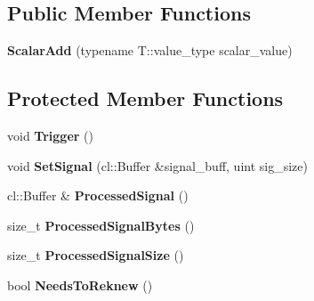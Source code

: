 \subsection*{Public Member Functions}
\begin{DoxyCompactItemize}
\item 
{\bfseries Scalar\+Add} (typename T\+::value\+\_\+type scalar\+\_\+value)\hypertarget{classjaspl_1_1ocl_1_1_scalar_add_a74c7684b1023fb5505afa57b65bbee2f}{}\label{classjaspl_1_1ocl_1_1_scalar_add_a74c7684b1023fb5505afa57b65bbee2f}

\end{DoxyCompactItemize}
\subsection*{Protected Member Functions}
\begin{DoxyCompactItemize}
\item 
void {\bfseries Trigger} ()\hypertarget{classjaspl_1_1ocl_1_1_scalar_add_a06f80054324b32d2a396f44e4220b061}{}\label{classjaspl_1_1ocl_1_1_scalar_add_a06f80054324b32d2a396f44e4220b061}

\item 
void {\bfseries Set\+Signal} (cl\+::\+Buffer \&signal\+\_\+buff, uint sig\+\_\+size)\hypertarget{classjaspl_1_1ocl_1_1_scalar_add_a5bb316f923cc37d6dff1144c1832decd}{}\label{classjaspl_1_1ocl_1_1_scalar_add_a5bb316f923cc37d6dff1144c1832decd}

\item 
cl\+::\+Buffer \& {\bfseries Processed\+Signal} ()\hypertarget{classjaspl_1_1ocl_1_1_scalar_add_a11727ab5b2e2c8bf8bdb8c9b8301caa0}{}\label{classjaspl_1_1ocl_1_1_scalar_add_a11727ab5b2e2c8bf8bdb8c9b8301caa0}

\item 
size\+\_\+t {\bfseries Processed\+Signal\+Bytes} ()\hypertarget{classjaspl_1_1ocl_1_1_scalar_add_aab31c814169b8419da653a79a150e3d2}{}\label{classjaspl_1_1ocl_1_1_scalar_add_aab31c814169b8419da653a79a150e3d2}

\item 
size\+\_\+t {\bfseries Processed\+Signal\+Size} ()\hypertarget{classjaspl_1_1ocl_1_1_scalar_add_a1af2d6e8f8ccf876f80afa76b9d47205}{}\label{classjaspl_1_1ocl_1_1_scalar_add_a1af2d6e8f8ccf876f80afa76b9d47205}

\item 
bool {\bfseries Needs\+To\+Reknew} ()\hypertarget{classjaspl_1_1ocl_1_1_scalar_add_abef2089f87e9d04f2d8ef4d448c7eb9b}{}\label{classjaspl_1_1ocl_1_1_scalar_add_abef2089f87e9d04f2d8ef4d448c7eb9b}

\end{DoxyCompactItemize}
